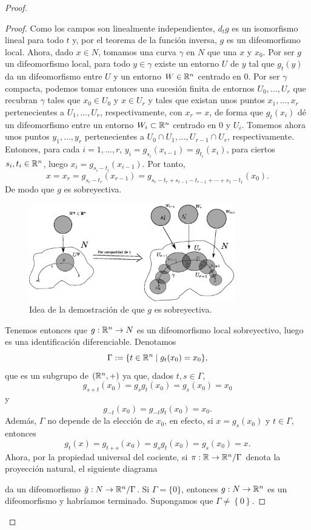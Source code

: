 \begin{proof}
\begin{proof}
Como los campos son linealmente independientes, $d_t g$ es un isomorfismo lineal para todo $t$ y, por el teorema de la función inversa, $g$ es un difeomorfismo local. Ahora, dado $x\in N$, tomamos una curva $\gamma$ en $N$ que una $x$ y $x_0$. Por ser $g$ un difeomorfismo local, para todo $y\in \gamma$ existe un entorno $U$ de $y$ tal que $g_t(y)$ da un difeomorfismo entre $U$ y un entorno $W\in \mathbb{R}^n$ centrado en $0$. Por ser $\gamma$ compacta, podemos tomar entonces una sucesión finita de entornos $U_0,\dots,U_r$ que recubran $\gamma$ tales que $x_0 \in U_0$ y $x \in U_r$ y tales que existan unos puntos $x_1,\dots,x_r$ pertenecientes a $U_1,\dots,U_r$, respectivamente, con $x_r=x$, de forma que $g_t(x_i)$ dé un difeomorfismo entre un entorno $W_i\subset \mathbb{R}^n$ centrado en $0$ y $U_i$. Tomemos ahora unos puntos $y_1,\dots,y_{r}$ pertenecientes a $U_0\cap U_1,\dots,U_{r-1}\cap U_r$, respectivamente. Entonces, para cada $i=1,\dots,r$, $y_i=g_{s_i}(x_{i-1})=g_{t_i}(x_{i})$, para ciertos $s_i, t_i \in \mathbb{R}^n$, luego $x_{i}=g_{s_i-t_i}(x_{i-1})$. Por tanto, 
$$x=x_{r}=g_{s_{r}-t_{r}}(x_{r-1})=g_{s_{r}-t_{r}+s_{r-1}-t_{r-1}+\cdots+s_1-t_1}(x_0).$$ De modo que $g$ es sobreyectiva.

\begin{figure}[h!]
  \centering
  \includegraphics[width=0.8\textwidth]{pics/entornos.eps}
  \caption{\small Idea de la demostración de que $g$ es sobreyectiva.}
  \label{fig:entornos}
\end{figure}

Tenemos entonces que $g:\mathbb{R}^n\rightarrow N$ es un difeomorfismo local sobreyectivo, luego es una identificación diferenciable. Denotamos 
\[  
  \Gamma:=\{t \in \mathbb{R}^n \mid g_t(x_0)=x_0\},
\]
que es un subgrupo de $(\mathbb{R}^n,+)$ ya que, dados $t, s \in \Gamma$, 
\[
  g_{s+t}(x_0)=g_sg_t(x_0)=g_s(x_0)=x_0
\]
y 
\[
  g_{-t}(x_0)=g_{-t}g_t(x_0)=x_0.
\] 
 Además, $\Gamma$ no depende de la elección de $x_0$, en efecto, si $x=g_s (x_0)$ y $t\in \Gamma$, entonces 
\[
  g_t (x) = g_{t+s}(x_0)=g_sg_t(x_0)=g_s(x_0)=x. 
 \] 
Ahora, por la propiedad universal del cociente, si $\pi:\mathbb{R}\rightarrow \mathbb{R}^n/\Gamma$ denota la proyección natural, el siguiente diagrama
\begin{center}
\end{center}
da un difeomorfismo $\tilde{g}:N\rightarrow \mathbb{R}^n/\Gamma$. Si $\Gamma=\{0\}$, entonces $g:N\rightarrow \mathbb{R}^n$ es un difeomorfismo y habríamos terminado. Supongamos que $\Gamma \neq\left\{ 0 \right\}$.


\end{proof}
\end{proof}
